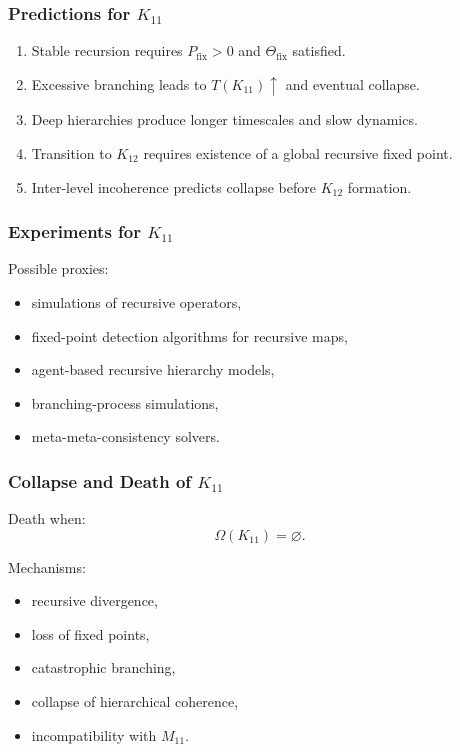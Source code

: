 \subsubsection{Predictions for $K_{11}$}

\begin{enumerate}
    \item Stable recursion requires $P_{\mathrm{fix}}>0$ and $\Theta_{\mathrm{fix}}$ satisfied.
    \item Excessive branching leads to $T(K_{11})\uparrow$ and eventual collapse.
    \item Deep hierarchies produce longer timescales and slow dynamics.
    \item Transition to $K_{12}$ requires existence of a global recursive fixed point.
    \item Inter-level incoherence predicts collapse before $K_{12}$ formation.
\end{enumerate}

\subsubsection{Experiments for $K_{11}$}

Possible proxies:
\begin{itemize}
    \item simulations of recursive operators,
    \item fixed-point detection algorithms for recursive maps,
    \item agent-based recursive hierarchy models,
    \item branching-process simulations,
    \item meta-meta-consistency solvers.
\end{itemize}

\subsubsection{Collapse and Death of $K_{11}$}

Death when:
\[
\Omega(K_{11})=\varnothing.
\]

Mechanisms:
\begin{itemize}
    \item recursive divergence,
    \item loss of fixed points,
    \item catastrophic branching,
    \item collapse of hierarchical coherence,
    \item incompatibility with $M_{11}$.
\end{itemize}

